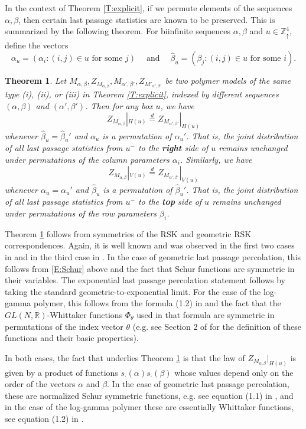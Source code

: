 \documentclass[aop, preprint]{imsart}
\theoremstyle{plain}
\newtheorem{theorem}{Theorem}[section]
\theoremstyle{definition}
\theoremstyle{plain}
\newcommand{\al}{\alpha}
\newcommand{\mathand}{\;\text{and}\;}
\newcommand{\be}{\beta}
\newcommand{\Zd}{\mathds{Z}^4_\uparrow}
\newcommand{\R}{\mathds{R}}
\newcommand{\eqd}{\stackrel{d}{=}}
\begin{document}
In the context of Theorem \ref{T:explicit}, if we permute elements of the sequences $\al, \be$, then certain last passage statistics are known to be preserved. This is summarized by the following theorem. For biinfinite sequences $\al, \be$ and $u \in \Zd$, define the vectors
$$
\al_u = (\al_i : (i, j) \in u \text{ for some } j) \quad \mathand \quad \hat \be_u = (\be_j : (i, j) \in u \text{ for some } i).
$$
\begin{theorem}
	\label{T:decoupled-family}
	Let $M_{\al, \be}, Z_{M_{\al, \be}}, M_{\al', \be'}, Z_{M'_{\al', \be'}}$ be two polymer models of the same type (i), (ii), or (iii) in Theorem \ref{T:explicit}, indexed by different sequences $(\al, \be)$ and $(\al', \be')$.  Then for any box $u$, we have 
	$$
	Z_{M_{\al, \be}}|_{H(u)} \eqd Z_{M_{\al', \be'}}|_{H(u)}
	$$
	whenever $\hat \be_u = \hat \be_u'$ and $\al_u$ is a permutation of $\al_u'$.
	That is, the joint distribution of all last passage statistics from $u^-$ to the \textbf{right} side of $u$ remains unchanged under permutations of the column parameters $\al_i$. Similarly, we have 
	$$
	Z_{M_{\al, \be}}|_{V(u)} \eqd Z_{M_{\al', \be'}}|_{V(u)}
	$$
	whenever $\al_u = \al_u'$ and $\hat \be_u$ is a permutation of $\hat \be_u'$.
	That is, the joint distribution of all last passage statistics from $u^-$ to the \textbf{top} side of $u$ remains unchanged under permutations of the row parameters $\be_i$.
\end{theorem}

Theorem \ref{T:decoupled-family} follows from symmetries of the RSK and geometric RSK correspondences. Again, it is well known and was observed in the first two cases in \citep{johansson2003discrete} and in the third case in \citep{corwin2014tropical}. In the case of geometric last passage percolation, this follows from \eqref{E:Schur} above and the fact that Schur functions are symmetric in their variables. The exponential last passage percolation statement follows by taking the standard geometric-to-exponential limit. For the case of the log-gamma polymer, this follows from the formula (1.2) in \cite{corwin2014tropical} and the fact that the $GL(N, \R)$-Whittaker functions $\Phi_\theta$ used in that formula are symmetric in permutations of the index vector $\theta$ (e.g. see Section 2 of \cite{o2014geometric} for the definition of these functions and their basic properties). 

 In both cases, the fact that underlies Theorem \ref{T:decoupled-family} is that the law of $Z_{M_{\al, \be}}|_{H(u)}$ is given by a product of functions $s_\cdot(\al) s_\cdot(\be)$ whose values depend only on the order of the vectors $\al$ and $\be$. In the case of geometric last passage percolation, these are normalized Schur symmetric functions, e.g. see equation (1.1) in \cite{corwin2014tropical}, and in the case of the log-gamma polymer these are essentially Whittaker functions, see equation (1.2) in \cite{corwin2014tropical}.
\end{document}
